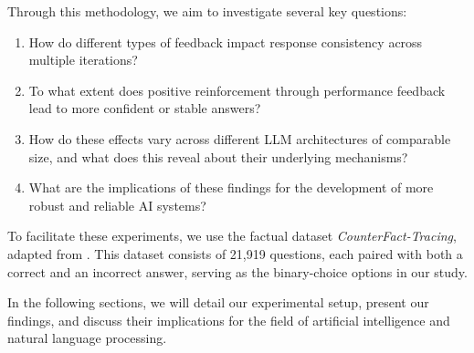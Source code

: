 Through this methodology, we aim to investigate several key questions:
\begin{enumerate}
\item How do different types of feedback impact response consistency across multiple iterations?
\item To what extent does positive reinforcement through performance feedback lead to more confident or stable answers?
\item How do these effects vary across different LLM architectures of comparable size, and what does this reveal about their underlying mechanisms?
\item What are the implications of these findings for the development of more robust and reliable AI systems?
\end{enumerate}
To facilitate these experiments, we use the factual dataset \textit{CounterFact-Tracing}, adapted from \cite{meng2022locating}. This dataset consists of 21,919 questions, each paired with both a correct and an incorrect answer, serving as the binary-choice options in our study.

In the following sections, we will detail our experimental setup, present our findings, and discuss their implications for the field of artificial intelligence and natural language processing.
